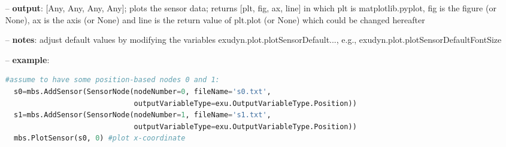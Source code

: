 \begin{itemize}[leftmargin=0.7cm]
\begin{itemize}[leftmargin=1.2cm]
\item[]{\it sizeInches}: given as list [sizeX, sizeY] with the sizes per (sub)plot given in inches; default: [6.4, 4.8]; in case of sub plots, the total size of the figure is computed from nx*sizeInches[0] and ny*sizeInches[1]
\item[]{\it fileName}: if this string is non-empty, figure will be saved to given path and filename (use figName.pdf to safe as PDF or figName.png to save as PNG image); use matplotlib.use('Agg') in order not to open figures if you just want to save them
\item[]{\it useXYZcomponents}: of True, it will use X, Y and Z for sensor components, e.g., measuring Position, Velocity, etc. wherever possible
\item[]{\it closeAll}: if True, close all figures before opening new one (do this only in first PlotSensor command!)
\item[]{\it [*kwargs]}:
\item[]{\it minorTicksXon}: if True, turn minor ticks for x-axis on
\item[]{\it minorTicksYon}: if True, turn minor ticks for y-axis on
\item[]{\it fileCommentChar}: if exists, defines the comment character in files (\#, %
\item[]{\it fileDelimiterChar}: if exists, defines the character indicating the columns for data (',', ' ', ';', ...)
\end{itemize}
\item[--]
{\bf output}: [Any, Any, Any, Any]; plots the sensor data; returns [plt, fig, ax, line] in which plt is matplotlib.pyplot, fig is the figure (or None), ax is the axis (or None) and line is the return value of plt.plot (or None) which could be changed hereafter
\item[--]
{\bf notes}: adjust default values by modifying the variables exudyn.plot.plotSensorDefault..., e.g., exudyn.plot.plotSensorDefaultFontSize
\item[--]
{\bf example}: \vspace{-12pt}\ei\begin{lstlisting}[language=Python, xleftmargin=36pt]
  #assume to have some position-based nodes 0 and 1:
  s0=mbs.AddSensor(SensorNode(nodeNumber=0, fileName='s0.txt',
                              outputVariableType=exu.OutputVariableType.Position))
  s1=mbs.AddSensor(SensorNode(nodeNumber=1, fileName='s1.txt',
                              outputVariableType=exu.OutputVariableType.Position))
  mbs.PlotSensor(s0, 0) #plot x-coordinate

\end{lstlisting}
\end{itemize}
